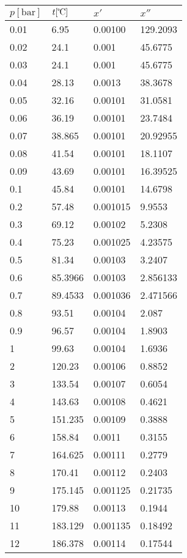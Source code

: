 \documentclass[twocolumn]{article}
\begin{document}
\begin{tabular}{l|l|l|l}
$p [\text{bar}] $ & $t [\text{\textcelsius{}}]$ & $x'$ & $x''$ \\ \hline
0.01	&	6.95	&	0.00100	&	129.2093  \\ \hline
0.02	&	24.1	&	0.001	&	45.6775  \\ \hline
0.03	&	24.1	&	0.001	&	45.6775  \\ \hline
0.04	&	28.13	&	0.0013	&	38.3678  \\ \hline
0.05	&	32.16	&	0.00101 &	31.0581  \\ \hline
0.06	&	36.19	&	0.00101	&	23.7484  \\ \hline
0.07	&	38.865	&	0.00101	&	20.92955  \\ \hline
0.08	&	41.54	&	0.00101	&	18.1107  \\ \hline
0.09	&	43.69	&	0.00101	&	16.39525  \\ \hline
0.1	&	45.84	&	0.00101	&	14.6798  \\ \hline
0.2	&	57.48	&	0.001015	&	9.9553  \\ \hline
0.3	&	69.12	&	0.00102	&	5.2308  \\ \hline
0.4	&	75.23	&	0.001025	&	4.23575  \\ \hline
0.5	&	81.34	&	0.00103	&	3.2407  \\ \hline
0.6	&	85.3966&	0.00103&	2.856133\\ \hline
0.7	&	89.4533&	0.001036&	2.471566\\ \hline
0.8	&	93.51	&	0.00104	&	2.087  \\ \hline
0.9	&	96.57	&	0.00104	&	1.8903  \\ \hline
1	&	99.63	&	0.00104	&	1.6936  \\ \hline
2	&	120.23	&	0.00106	&	0.8852  \\ \hline
3	&	133.54	&	0.00107	&	0.6054  \\ \hline
4	&	143.63	&	0.00108	&	0.4621  \\ \hline
5	&	151.235	&	0.00109	&	0.3888  \\ \hline
6	&	158.84	&	0.0011	&	0.3155  \\ \hline
7	&	164.625	&	0.00111	&	0.2779  \\ \hline
8	&	170.41	&	0.00112	&	0.2403  \\ \hline
9	&	175.145	&	0.001125	&	0.21735  \\ \hline
10	&	179.88	&	0.00113	&	0.1944  \\ \hline
11	&	183.129	&	0.001135	&	0.18492  \\ \hline
12	&	186.378	&	0.00114	&	0.17544  \\ \hline

\end{tabular}
\end{document}
